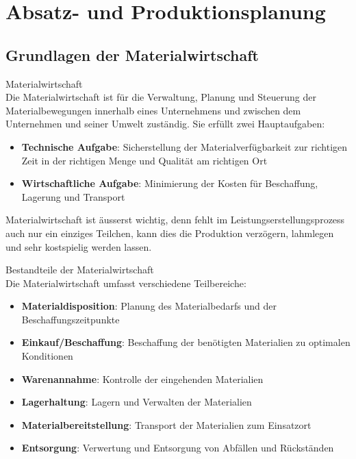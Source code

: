 \section{Absatz- und Produktionsplanung}

\subsection{Grundlagen der Materialwirtschaft}

\begin{definition}{Materialwirtschaft}\\
Die Materialwirtschaft ist für die Verwaltung, Planung und Steuerung der Materialbewegungen innerhalb eines Unternehmens und zwischen dem Unternehmen und seiner Umwelt zuständig. Sie erfüllt zwei Hauptaufgaben:
\begin{itemize}
    \item \textbf{Technische Aufgabe}: Sicherstellung der Materialverfügbarkeit zur richtigen Zeit in der richtigen Menge und Qualität am richtigen Ort
    \item \textbf{Wirtschaftliche Aufgabe}: Minimierung der Kosten für Beschaffung, Lagerung und Transport
\end{itemize}

Materialwirtschaft ist äusserst wichtig, denn fehlt im Leistungserstellungsprozess auch nur ein einziges Teilchen, kann dies die Produktion verzögern, lahmlegen und sehr kostspielig werden lassen.
\end{definition}

\begin{definition}{Bestandteile der Materialwirtschaft}\\
Die Materialwirtschaft umfasst verschiedene Teilbereiche:
\begin{itemize}
    \item \textbf{Materialdisposition}: Planung des Materialbedarfs und der Beschaffungszeitpunkte
    \item \textbf{Einkauf/Beschaffung}: Beschaffung der benötigten Materialien zu optimalen Konditionen
    \item \textbf{Warenannahme}: Kontrolle der eingehenden Materialien
    \item \textbf{Lagerhaltung}: Lagern und Verwalten der Materialien
    \item \textbf{Materialbereitstellung}: Transport der Materialien zum Einsatzort
    \item \textbf{Entsorgung}: Verwertung und Entsorgung von Abfällen und Rückständen
\end{itemize}
\end{definition}

